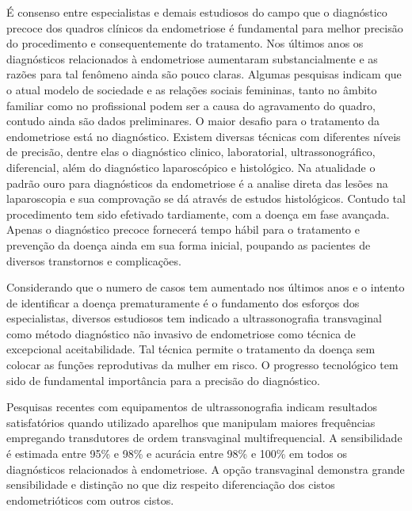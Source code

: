 \documentclass[12pt]{article} %
\begin{document}
É consenso entre especialistas e demais estudiosos do campo que o diagnóstico precoce dos quadros clínicos da endometriose é fundamental para melhor precisão do procedimento e consequentemente do tratamento. Nos últimos anos os diagnósticos relacionados à endometriose aumentaram substancialmente e as razões para tal fenômeno ainda são pouco claras. Algumas pesquisas indicam que o atual modelo de sociedade e as relações sociais femininas, tanto no âmbito familiar como no profissional podem ser a causa do agravamento do quadro, contudo ainda são dados preliminares.
O maior desafio para o tratamento da endometriose está no diagnóstico. Existem diversas técnicas com diferentes níveis de precisão, dentre elas o diagnóstico clinico, laboratorial, ultrassonográfico, diferencial, além do diagnóstico laparoscópico e histológico.  Na atualidade o padrão ouro para diagnósticos da endometriose é a analise direta das lesões na laparoscopia e sua comprovação se dá através de estudos histológicos. Contudo tal procedimento tem sido efetivado tardiamente, com a doença em fase avançada. Apenas o diagnóstico precoce fornecerá tempo hábil para o tratamento e prevenção da doença ainda em sua forma inicial, poupando as pacientes de diversos transtornos e complicações.

Considerando que o numero de casos tem aumentado nos últimos anos e o intento de
identificar a doença prematuramente é o fundamento dos esforços dos especialistas, diversos estudiosos tem indicado a ultrassonografia transvaginal como método diagnóstico não invasivo de endometriose como técnica de excepcional aceitabilidade.  Tal técnica permite o tratamento da doença sem colocar as funções reprodutivas da mulher em risco. O progresso tecnológico tem sido de fundamental importância para a precisão do diagnóstico.

Pesquisas recentes com equipamentos de ultrassonografia indicam resultados satisfatórios quando utilizado aparelhos que manipulam maiores frequências empregando transdutores de ordem transvaginal multifrequencial. A sensibilidade é estimada entre 95\% e 98\% e acurácia entre 98\% e 100\% em todos os diagnósticos relacionados à endometriose. A opção transvaginal demonstra grande sensibilidade e distinção no que diz respeito diferenciação dos cistos endometrióticos com outros cistos.
\end{document}
